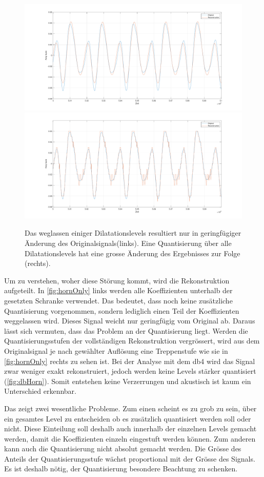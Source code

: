 \begin{refsection}
\begin{figure}
\includegraphics[width=0.5\linewidth]{papers/compress/Bilder/hornOnlyLevs.pdf}
\includegraphics[width=0.5\linewidth]{papers/compress/Bilder/hornOnlyQuant.pdf}
\caption{Das weglassen einiger Dilatationslevels resultiert nur in geringfügiger Änderung des Originalsignals(links).
Eine Quantisierung über alle Dilatationslevels hat eine grosse Änderung des Ergebnisses zur Folge (rechts).}
\label{fig:hornOnly}
\end{figure}
Um zu verstehen, woher diese Störung kommt, wird die Rekonstruktion aufgeteilt.
In \autoref{fig:hornOnly} links werden alle Koeffizienten unterhalb der gesetzten Schranke verwendet. 
Das bedeutet, dass noch keine zusätzliche Quantisierung vorgenommen, sondern lediglich einen Teil der Koeffizienten weggelassen wird.
Dieses Signal weicht nur geringfügig vom Original ab.
Daraus lässt sich vermuten, dass das Problem an der Quantisierung liegt.
Werden die Quantisierungsstufen der vollständigen Rekonstruktion vergrössert, wird aus dem Originalsignal je nach gewählter Auflösung eine Treppenstufe wie sie in \autoref{fig:hornOnly} rechts zu sehen ist.
Bei der Analyse mit dem db4 wird das Signal zwar weniger exakt rekonstruiert, jedoch werden keine Levels stärker quantisiert (\autoref{fig:dbHorn}).
Somit entstehen keine Verzerrungen und akustisch ist kaum ein Unterschied erkennbar.

Das zeigt zwei wesentliche Probleme.
Zum einen scheint es zu grob zu sein, über ein gesamtes Level zu entscheiden ob es zusätzlich quantisiert werden soll oder nicht.
Diese Einteilung soll deshalb auch innerhalb der einzelnen Levels gemacht werden, damit die Koeffizienten einzeln eingestuft werden können.
Zum anderen kann auch die Quantisierung nicht absolut gemacht werden.
Die Grösse des Anteils der Quantisierungsstufe wächst proportional mit der Grösse des Signals.
Es ist deshalb nötig, der Quantisierung besondere Beachtung zu schenken.


\end{refsection}
